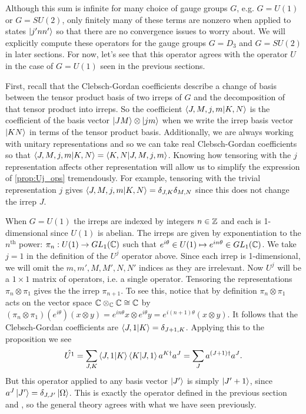 \documentclass[10pt,reqno]{amsart}
\numberwithin{equation}{section}
\begin{document}
	Although this sum is infinite for many choice of gauge groups $G$, e.g. $G=U(1)$ or $G=SU(2)$, only finitely many of these terms are nonzero when applied to states $\ket{j'nn'}$ so that there are no convergence issues to worry about.
	We will explicitly compute these operators for the gauge groups $G=D_3$ and $G=SU(2)$ in later sections.
	For now, let's see that this operator agrees with the operator $U$ in the case of $G=U(1)$ seen in the previous sections.
	
	First, recall that the Clebsch-Gordan coefficients describe a change of basis between the tensor product basis of two irreps of $G$ and the decomposition of that tensor product into irreps.
	So the coefficient $\braket{J,M,j,m}{K,N}$ is the coefficient of the basis vector $\ket{JM}\otimes \ket{jm}$ when we write the irrep basis vector $\ket{KN}$ in terms of the tensor product basis.
	Additionally, we are always working with unitary representations and so we can take real Clebsch-Gordan coefficients so that $\braket{J,M,j,m}{K,N}=\braket{K,N}{J,M,j,m}$.
	Knowing how tensoring with the $j$ representation affects other representation will allow us to simplify the expression of \cref{prop:Uj_ops} tremendously.
	For example, tensoring with the trivial representation $j$ gives $\braket{J,M,j,m}{K,N}=\delta_{J,K}\delta_{M,N}$ since this does not change the irrep $J$.
	
	When $G=U(1)$ the irreps are indexed by integers $n\in\mathbb{Z}$ and each is 1-dimensional since $U(1)$ is abelian. 
	The irreps are given by exponentiation to the $n^\text{th}$ power: $\pi_n: U(1) \to GL_1(\mathbb{C})$ such that $e^{i\theta} \in U(1) \mapsto e^{in\theta} \in GL_1(\mathbb{C})$.
	We take $j=1$ in the definition of the $U^j$ operator above. 
	Since each irrep is 1-dimensional, we will omit the $m,m',M,M',N,N'$ indices as they are irrelevant. 
	Now $U^j$ will be a $1\times 1$ matrix of operators, i.e. a single operator.
	Tensoring the representations $\pi_n \otimes \pi_1$ gives the the irrep $\pi_{n+1}$. 
	To see this, notice that by definition $\pi_n \otimes \pi_1$ acts on the vector space $\mathbb{C} \otimes_{\mathbb{C}} \mathbb{C} \cong \mathbb{C}$ by  $(\pi_n\otimes\pi_1)(e^{i\theta})(x\otimes y)=e^{in\theta}x\otimes e^{i\theta}y=e^{i(n+1)\theta}(x\otimes y).$
	It follows that the Clebsch-Gordan coefficients are $\braket{J,1}{K}=\delta_{J+1,K}$.
	Applying this to the proposition we see
	\begin{equation}
		\hat{U^1}=\sum_{J,K} \braket{J,1}{K}\braket{K}{J,1} a^{K\dagger} a^J = \sum_{J} a^{(J+1)\dagger} a^J.
	\end{equation}
	But this operator applied to any basis vector $\ket{J'}$ is simply $\ket{J'+1}$, since $a^J\ket{J'}=\delta_{J,J'}\ket{\Omega}$.
	This is exactly the operator defined in the previous section and \cite{Hamer82}, so the general theory agrees with what we have seen previously.
	
\end{document}
